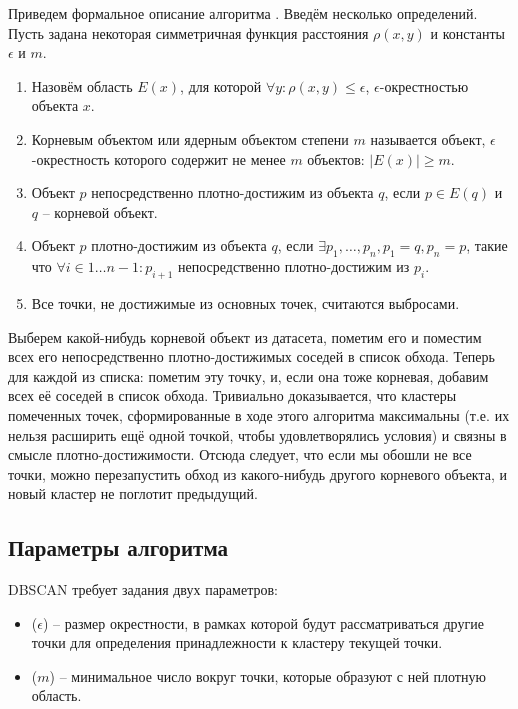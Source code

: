 Приведем формальное описание алгоритма \cite{wiki,habr}. Введём несколько определений. Пусть задана некоторая симметричная функция расстояния $\rho(x, y)$ и константы $\epsilon$ и $m$.

\begin{enumerate}
	\item Назовём область $E(x)$, для которой $\forall y: \rho(x, y) \leq \epsilon$, $\epsilon$-окрестностью объекта $x$.
	\item Корневым объектом или ядерным объектом степени $m$ называется объект, $\epsilon$-окрестность которого содержит не менее $m$ объектов: $\left| E(x) \right| \geq m$.
	\item Объект $p$ непосредственно плотно-достижим из объекта $q$, если $p \in E(q)$ и $q$ -- корневой объект.
	\item Объект $p$ плотно-достижим из объекта $q$, если $\exists p_1, \dots, p_n, p_1 = q, p_n = p$, такие что $\forall i \in 1 \dots n - 1: p_{i + 1}$ непосредственно плотно-достижим из $p_i$.
	\item Все точки, не достижимые из основных точек, считаются выбросами.
\end{enumerate}

Выберем какой-нибудь корневой объект  из датасета, пометим его и поместим всех его непосредственно плотно-достижимых соседей в список обхода. Теперь для каждой  из списка: пометим эту точку, и, если она тоже корневая, добавим всех её соседей в список обхода. Тривиально доказывается, что кластеры помеченных точек, сформированные в ходе этого алгоритма максимальны (т.е. их нельзя расширить ещё одной точкой, чтобы удовлетворялись условия) и связны в смысле плотно-достижимости. Отсюда следует, что если мы обошли не все точки, можно перезапустить обход из какого-нибудь другого корневого объекта, и новый кластер не поглотит предыдущий.

\subsection{Параметры алгоритма }

DBSCAN требует задания двух параметров:

\begin{itemize}
	\item {} ($\epsilon$) -- размер окрестности, в рамках которой будут рассматриваться другие точки для определения принадлежности к кластеру текущей точки.
	\item {} ($m$) -- минимальное число вокруг точки, которые образуют с ней плотную область.
\end{itemize}

